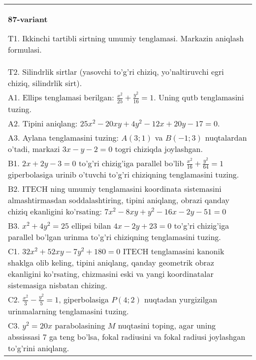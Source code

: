 \documentclass{article}
\begin{document}
\begin{tabular}{m{17cm}}
\textbf{87-variant}
\newline

T1. Ikkinchi tartibli sirtning umumiy tenglamasi. Markazin aniqlash formulasi.\\

T2. Silindrlik sirtlar (yasovchi to'g'ri chiziq, yo'naltiruvchi egri chiziq, silindrlik sirt).\\

A1. Ellips tenglamasi berilgan: $\frac{x^2}{25}+\frac{y^2}{16}=1$. Uning qutb tenglamasini tuzing.\\

A2. Tipini aniqlang: $25x^{2}-20xy+4y^{2}-12x+20y-17=0$.\\

A3. Aylana tenglamasini tuzing: $A(3;1)$ va $B(-1;3)$ nuqtalardan o'tadi, markazi $3x-y-2=0$ togri chiziqda joylashgan.\\

B1. $2x + 2y - 3 = 0$ to'g'ri chizig'iga parallel bo'lib $\frac{x^{2}}{16} + \frac{y^{2}}{64} = 1$ giperbolasiga urinib o'tuvchi to'g'ri chiziqning tenglamasini tuzing.  \\

B2. ITECH ning umumiy tenglamasini koordinata sistemasini almashtirmasdan soddalashtiring, tipini aniqlang, obrazi qanday chiziq ekanligini ko'rsating: $7x^{2} - 8xy + y^{2} - 16x - 2y - 51 = 0$\\

B3. $x^{2} + 4y^{2} = 25$ ellipsi bilan $4x - 2y + 23 = 0$ to'g'ri chizig'iga parallel bo'lgan urinma to'g'ri chiziqning tenglamasini tuzing.  \\

C1. $32x^{2} + 52xy - 7y^{2} + 180 = 0$ ITECH tenglamasini kanonik shaklga olib keling, tipini aniqlang, qanday geometrik obraz ekanligini ko'rsating, chizmasini eski va yangi koordinatalar sistemasiga nisbatan chizing.  \\

C2. $\frac{x^{2}}{3} - \frac{y^{2}}{5} = 1$, giperbolasiga $P(4;2)$ nuqtadan yurgizilgan urinmalarning tenglamasini tuzing.  \\

C3. $y^{2} = 20x$ parabolasining $M$ nuqtasini toping, agar uning abssissasi 7 ga teng bo'lsa, fokal radiusini va fokal radiusi joylashgan to'g'rini aniqlang.\\

\end{tabular}
\vspace{1cm}
\end{document}
